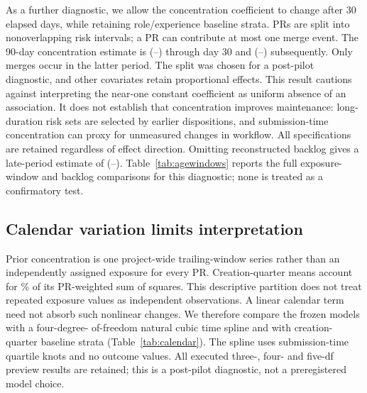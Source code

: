 \documentclass[11pt]{article}
\begin{document}
\begin{table}[tb]
\centering\small
\caption{Exposure-window sensitivity. Hazard ratios concern a 0.1 increase in
prior merger HHI. All specifications retain prior merge volume and calendar time.}
\label{tab:windows}
\end{table}

As a further diagnostic, we allow the concentration coefficient to change after
30 elapsed days, while retaining role/experience baseline strata. PRs are split
into nonoverlapping risk intervals; a PR can contribute at most one merge event.
The 90-day concentration estimate is \PieceEarlyHR{}
(\PieceEarlyLower{}--\PieceEarlyUpper{}) through day 30 and \PieceLateHR{}
(\PieceLateLower{}--\PieceLateUpper{}) subsequently. Only
\PieceLateMergeEvents{} merges occur in the latter period. The split was chosen
for a post-pilot diagnostic, and other covariates retain proportional effects.
This result cautions against interpreting the near-one constant coefficient as
uniform absence of an association. It does not establish that concentration
improves maintenance: long-duration risk sets are selected by earlier dispositions,
and submission-time concentration can proxy for unmeasured changes in workflow.
All specifications are retained regardless of effect direction.
Omitting reconstructed backlog gives a late-period estimate of
\PieceNoBacklogLateHR{} (\PieceNoBacklogLateLower{}--\PieceNoBacklogLateUpper{}).
Table~\ref{tab:agewindows} reports the full exposure-window and backlog comparisons
for this diagnostic; none is treated as a confirmatory test.

\subsection{Calendar variation limits interpretation}
Prior concentration is one project-wide trailing-window series rather than an
independently assigned exposure for every PR. Creation-quarter means account
for \CalendarBetweenQuarterPercent{}\% of its PR-weighted sum of squares.
This descriptive partition does not treat repeated exposure values as
independent observations. A linear calendar term need not absorb such
nonlinear changes. We therefore compare the frozen models with a four-degree-
of-freedom natural cubic time spline and with creation-quarter baseline strata
(Table~\ref{tab:calendar}). The spline uses submission-time quartile knots and
no outcome values. All executed three-, four- and five-df preview results are
retained; this is a post-pilot diagnostic, not a preregistered model choice.
\end{document}
